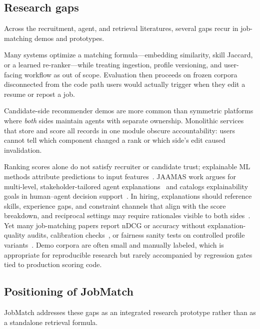 \subsection{Research gaps}\label{sec:2-gaps}

Across the recruitment, agent, and retrieval literatures, several gaps recur in job-matching demos and prototypes.

Many systems optimize a matching formula---embedding similarity, skill Jaccard, or a learned re-ranker---while treating ingestion, profile versioning, and user-facing workflow as out of scope.
Evaluation then proceeds on frozen corpora disconnected from the code path users would actually trigger when they edit a resume or repost a job.

Candidate-side recommender demos are more common than symmetric platforms where \emph{both} sides maintain agents with separate ownership.
Monolithic services that store and score all records in one module obscure accountability: users cannot tell which component changed a rank or which side's edit caused invalidation.

Ranking scores alone do not satisfy recruiter or candidate trust; explainable ML methods attribute predictions to input features~\cite{Ribeiro2016}.
JAAMAS work argues for multi-level, stakeholder-tailored agent explanations~\cite{Yan2025MultiExplain} and catalogs explainability goals in human--agent decision support~\cite{Rosenfeld2019HAS}.
In hiring, explanations should reference skills, experience gaps, and constraint channels that align with the score breakdown, and reciprocal settings may require rationales visible to both sides~\cite{Kleinerman2018Reciprocal}.
Yet many job-matching papers report nDCG or accuracy without explanation-quality audits, calibration checks~\cite{Platt1999}, or fairness sanity tests on controlled profile variants~\cite{Ribeiro2016}.
Demo corpora are often small and manually labeled, which is appropriate for reproducible research but rarely accompanied by regression gates tied to production scoring code.

\subsection{Positioning of JobMatch}\label{sec:2-positioning}

JobMatch addresses these gaps as an integrated research prototype rather than as a standalone retrieval formula.

